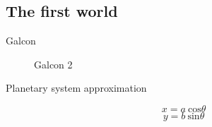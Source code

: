 \documentclass{beamer}
\begin{document}
\subsection{The first world}
\begin{frame}{Galcon}
\begin{figure}[H]
\noindent{}
\caption{Galcon 2}
\end{figure}
\end{frame}
\begin{frame}{Planetary system approximation}
\begin{figure}[H]
\begin{minipage}{.65\textwidth}
\noindent{}
\end{minipage}
\begin{minipage}{.3\textwidth}
$$x = a \: \mathrm{cos} \theta$$
           $$y = b \: \mathrm{sin} \theta$$
\end{minipage}
\end{figure}
\end{frame}
\end{document}
